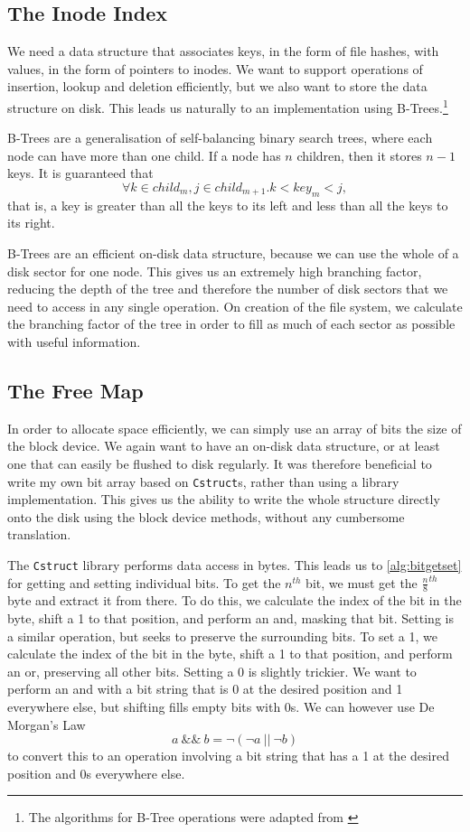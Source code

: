 \documentclass[12pt,a4paper,twoside,openright]{report}
\begin{document}
\subsection{The Inode Index}
\label{subsec:inodeindex}

We need a data structure that associates keys, in the form of file hashes, with values, in the form of pointers to inodes. We want to support operations of insertion, lookup and deletion efficiently, but we also want to store the data structure on disk. This leads us naturally to an implementation using B-Trees.\footnote{The algorithms for B-Tree operations were adapted from \cite{CLRS09}}

B-Trees are a generalisation of self-balancing binary search trees, where each node can have more than one child. If a node has $n$ children, then it stores $n-1$ keys. It is guaranteed that $$ \forall k \in child_m, j \in child_{m+1} . k < key_m < j, $$ that is, a key is greater than all the keys to its left and less than all the keys to its right.

B-Trees are an efficient on-disk data structure, because we can use the whole of a disk sector for one node. This gives us an extremely high branching factor, reducing the depth of the tree and therefore the number of disk sectors that we need to access in any single operation. On creation of the file system, we calculate the branching factor of the tree in order to fill as much of each sector as possible with useful information.

\subsection{The Free Map}
\label{subsec:freemap}

In order to allocate space efficiently, we can simply use an array of bits the size of the block device. We again want to have an on-disk data structure, or at least one that can easily be flushed to disk regularly. It was therefore beneficial to write my own bit array based on \texttt{Cstruct}s, rather than using a library implementation. This gives us the ability to write the whole structure directly onto the disk using the block device methods, without any cumbersome translation.

The \texttt{Cstruct} library performs data access in bytes. This leads us to \cref{alg:bitgetset} for getting and setting individual bits. To get the $n^{th}$ bit, we must get the $\frac{n}{8}^{th}$ byte and extract it from there. To do this, we calculate the index of the bit in the byte, shift a 1 to that position, and perform an and, masking that bit. Setting is a similar operation, but seeks to preserve the surrounding bits. To set a 1, we calculate the index of the bit in the byte, shift a 1 to that position, and perform an or, preserving all other bits. Setting a 0 is slightly trickier. We want to perform an and with a bit string that is 0 at the desired position and 1 everywhere else, but shifting fills empty bits with 0s. We can however use De Morgan's Law $$ a~\&\&~b = \neg (\neg a~||~\neg b) $$ to convert this to an operation involving a bit string that has a 1 at the desired position and 0s everywhere else.
\end{document}
